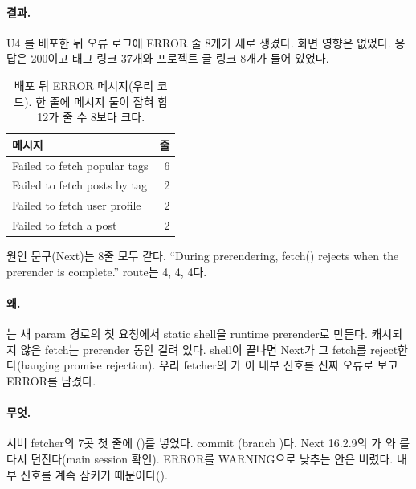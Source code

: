 \paragraph{결과.}
U4 를 배포한 뒤  오류 로그에 ERROR 줄 8개가 새로 생겼다.
화면 영향은 없었다. 응답은 200이고  태그 링크 37개와 프로젝트 글 링크 8개가 들어 있었다.
\begin{table}[H]
  \caption{배포 뒤 ERROR 메시지(우리 코드). 한 줄에 메시지 둘이 잡혀 합 12가 줄 수 8보다 크다.}
  \label{tab:le-prerender}
  \centering\small
  \begin{tabularx}{\linewidth}{@{}Y r@{}}
    \toprule
    메시지 & 줄 \\
    \midrule
    Failed to fetch popular tags & 6 \\
    \midrule
    Failed to fetch posts by tag & 2 \\
    \midrule
    Failed to fetch user profile & 2 \\
    \midrule
    Failed to fetch a post & 2 \\
    \bottomrule
  \end{tabularx}
\end{table}
원인 문구(Next)는 8줄 모두 같다. ``During prerendering, fetch() rejects when the prerender is complete.''
route는 \code{/[handle]/[slug]} 4,  4,  4다.

\paragraph{왜.}
는 새 param 경로의 첫 요청에서 static shell을 runtime prerender로 만든다.
캐시되지 않은 fetch는 prerender 동안 걸려 있다. shell이 끝나면 Next가 그 fetch를 reject한다(hanging promise rejection).
우리 fetcher의 가 이 내부 신호를 진짜 오류로 보고 ERROR를 남겼다.

\paragraph{무엇.}
서버 fetcher의  7곳 첫 줄에 ()를 넣었다.
commit (branch )다.
Next 16.2.9의 가 와 를 다시 던진다(main session 확인).
ERROR를 WARNING으로 낮추는 안은 버렸다. 내부 신호를 계속 삼키기 때문이다().

